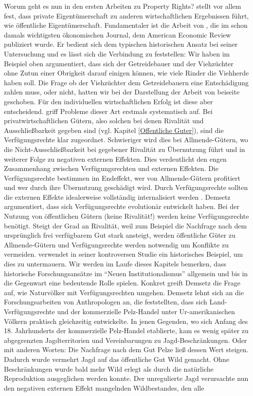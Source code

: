 Worum geht es nun in den ersten Arbeiten zu Property Rights? \textcite{Alchian1965} stellt vor allem fest, dass private Eigentümerschaft zu anderen wirtschaftlichen Ergebnissen führt, wie öffentliche Eigentümerschaft. Fundamentaler ist die Arbeit von \textcite{Demsetz1967}, die im schon damals wichtigsten ökonomischen Journal, dem American Economic Review publiziert wurde. Er bedient sich dem typischen historischen Ansatz bei seiner Untersuchung und es lässt sich die Verbindung zu \textcite{Coase1960} feststellen: Wir haben im Beispiel oben argumentiert, dass sich der Getreidebauer und der Viehzüchter ohne Zutun einer Obrigkeit darauf einigen können, wie viele Rinder die Viehherde haben soll. Die Frage ob der Viehzüchter dem Getreidebauern eine Entschädigung zahlen muss, oder nicht, hatten wir bei der Darstellung der Arbeit von \textcite{Coase1960} beiseite geschoben. Für den individuellen wirtschaftlichen Erfolg ist diese aber entscheidend. \textcite{Demsetz1967} griff Probleme dieser Art erstmals systematisch auf. Bei privatwirtschaftlichen Gütern, also solchen bei denen Rivalität und Ausschließbarkeit gegeben sind (vgl. Kapitel \ref{Offentliche Guter}), sind die Verfügungsrechte klar zugeordnet. Schwieriger wird dies bei Allmende-Gütern, wo die Nicht-Ausschließbarkeit bei gegebener Rivalität zu Übernutzung führt und in weiterer Folge zu negativen externen Effekten. Dies verdeutlicht den engen Zusammenhang zwischen Verfügungsrechten und externen Effekten. Die Verfügungsrechte bestimmen im Endeffekt, wer von Allmende-Gütern profitiert und wer durch ihre Übernutzung geschädigt wird. Durch Verfügungsrechte sollten die externen Effekte idealerweise vollständig internalisiert werden \parencite[S. 348]{Demsetz1967}. Demsetz argumentiert, dass sich Verfügungsrechte evolutionär entwickelt haben. Bei der Nutzung von öffentlichen Gütern (keine Rivalität!) werden keine Verfügungsrechte benötigt. Steigt der Grad an Rivalität, weil zum Beispiel die Nachfrage nach dem ursprünglich frei verfügbarem Gut stark ansteigt, werden öffentliche Güter zu Allmende-Gütern und Verfügungsrechte werden notwendig um Konflikte zu vermeiden. \textcite{Demsetz1967} verwendet in seiner kontroversen \parencite[S. 8]{Menard2014} Studie ein historisches Beispiel, um dies zu untermauern. Wir werden im Laufe dieses Kapitels bemerken, dass historische Forschungsansätze im "`Neuen Institutionalismus"' allgemein und bis in die Gegenwart eine bedeutende Rolle spielen. Konkret greift Demsetz die Frage auf, wie Naturvölker mit Verfügungsrechten umgehen. Demsetz lehnt sich an die Forschungsarbeiten von Anthropologen an, die feststellten, dass sich Land-Verfügungsrechte und der kommerzielle Pelz-Handel unter Ur-amerikanischen Völkern praktisch gleichzeitig entwickelte. In jenen Gegenden, wo sich Anfang des 18. Jahrhunderts der kommerzielle Pelz-Handel etablierte, kam es wenig später zu abgegrenzten Jagdterritorien und Vereinbarungen zu Jagd-Beschränkungen. Oder mit anderen Worten: Die Nachfrage nach dem Gut Pelze ließ dessen Wert steigen. Dadurch wurde vermehrt Jagd auf das öffentliche Gut Wild gemacht. Ohne Beschränkungen wurde bald mehr Wild erlegt als durch die natürliche Reproduktion ausgeglichen werden konnte. Der unregulierte Jagd verursachte nun den negativen externen Effekt mangelnden Wildbestandes, den alle 